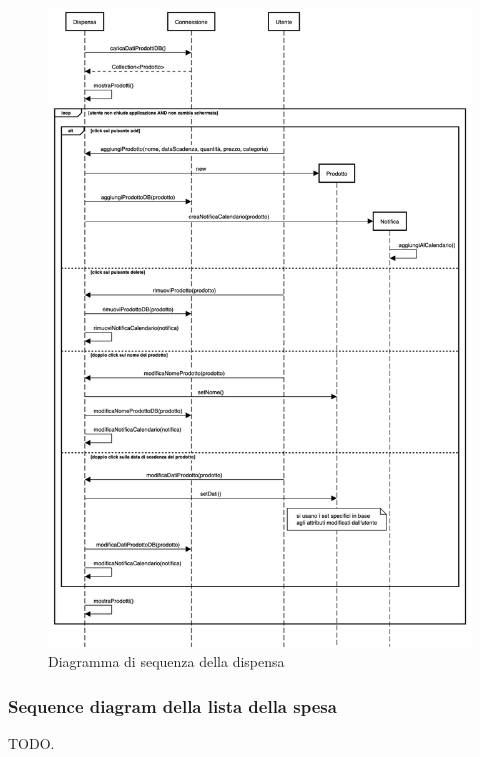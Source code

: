\documentclass{article}
\begin{document}
\begin{figure}[H]
    \includegraphics[width=\linewidth]{images/sequence-pantry.png}
    \caption{Diagramma di sequenza della dispensa}
    \label{fig:seqpantry}
\end{figure}

\subsubsection{Sequence diagram della lista della spesa}

TODO.
\end{document}
